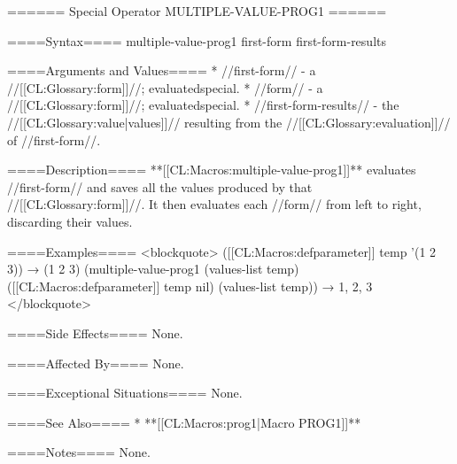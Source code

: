 ====== Special Operator MULTIPLE-VALUE-PROG1 ======

====Syntax====
\DefspecWithValues multiple-value-prog1 {first-form } {first-form-results}

====Arguments and Values====
  * //first-form// - a //[[CL:Glossary:form]]//; evaluatedspecial.
  * //form// - a //[[CL:Glossary:form]]//; evaluatedspecial.
  * //first-form-results// - the //[[CL:Glossary:value|values]]// resulting from the //[[CL:Glossary:evaluation]]// of //first-form//.

====Description====
**[[CL:Macros:multiple-value-prog1]]** evaluates //first-form// and saves all the values produced by that //[[CL:Glossary:form]]//. It then evaluates each //form// from left to right, discarding their values.

====Examples====
<blockquote> ([[CL:Macros:defparameter]] temp '(1 2 3)) → (1 2 3) (multiple-value-prog1 (values-list temp) ([[CL:Macros:defparameter]] temp nil) (values-list temp)) → 1, 2, 3 </blockquote>

====Side Effects====
None.

====Affected By====
None.

====Exceptional Situations====
None.

====See Also====
  * **[[CL:Macros:prog1|Macro PROG1]]**

====Notes====
None.

